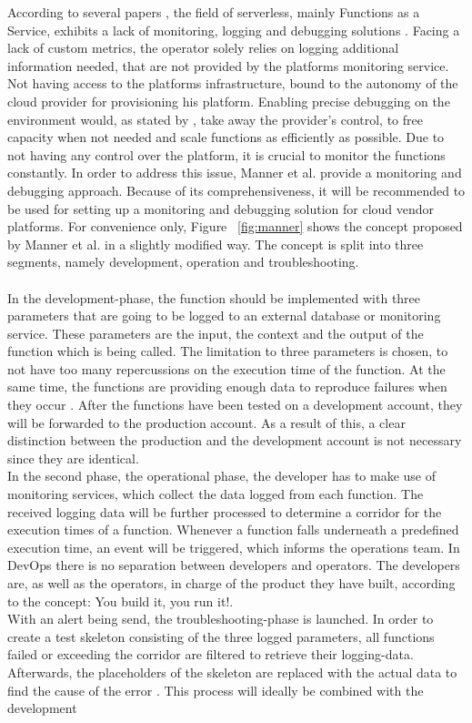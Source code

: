 \documentclass[a4paper,twoside,11pt, pagesize]{scrartcl}
\begin{document}
\begin{spacing}{1.2}
According to several papers \cite{roberts2017serverless} \cite{baldini2017serverless}, the field of serverless, mainly Functions as a Service, exhibits a lack of monitoring, logging and debugging solutions \cite{kritikos2018review}. Facing a lack of custom metrics, the operator solely relies on logging additional information needed, that are not provided by the platforms monitoring service. Not having access to the platforms infrastructure, bound to the autonomy of the cloud provider for provisioning his platform. Enabling precise debugging on the environment would, as stated by \cite{manner2019troubleshooting}, take away the provider's control, to free capacity when not needed and scale functions as efficiently as possible. Due to not having any control over the platform, it is crucial to monitor the functions constantly. In order to address this issue, Manner et al. provide a monitoring and debugging approach. Because of its comprehensiveness, it will be recommended to be used for setting up a monitoring and debugging solution for cloud vendor platforms. For convenience only, Figure ~\ref{fig:manner} shows the concept proposed by Manner et al. in a slightly modified way. The concept is split into three segments, namely development, operation and troubleshooting.\\\\ In the development-phase, the function should be implemented with three parameters that are going to be logged to an external database or monitoring service. These parameters are the input, the context and the output of the function which is being called. The limitation to three parameters is chosen, to not have too many repercussions on the execution time of the function. At the same time, the functions are providing enough data to reproduce failures when they occur \cite{manner2019troubleshooting}. After the functions have been tested on a development account, they will be forwarded to the production account. As a result of this, a clear distinction between the production and the development account is not necessary since they are identical. \\ In the second phase, the operational phase, the developer has to make use of monitoring services, which collect the data logged from each function. The received logging data will be further processed to determine a corridor for the execution times of a function. Whenever a function falls underneath a predefined execution time, an event will be triggered, which informs the operations team. In DevOps there is no separation between developers and operators. The developers are, as well as the operators, in charge of the product they have built, according to the concept: \glqq You build it, you run it!\grqq{}.\\ With an alert being send, the troubleshooting-phase is launched. In order to create a test skeleton consisting of the three logged parameters, all functions failed or exceeding the corridor are filtered to retrieve their logging-data. Afterwards, the placeholders of the skeleton are replaced with the actual data to find the cause of the error \cite{manner2019troubleshooting}. This process will ideally be combined with the development 
\end{spacing}
\end{document}
